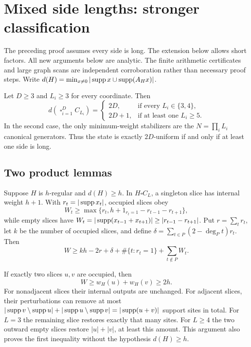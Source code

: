 \clearpage
\section*{Mixed side lengths: stronger classification}

The preceding proof assumes every side is long. The extension below allows short factors. All new arguments below are analytic. The finite arithmetic certificates and large graph scans are independent corroboration rather than necessary proof steps. Write $d(H)=\min_{x\ne0}|\operatorname{supp} x\cup\operatorname{supp}(A_Hx)|$.

\begin{theorem}\label{thm:mixed}
Let $D\ge3$ and $L_i\ge3$ for every coordinate. Then
\[
d\!\left(\mathop{\square}_{i=1}^{D}C_{L_i}\right)=
\begin{cases}
2D,&\text{if every }L_i\in\{3,4\},\\
2D+1,&\text{if at least one }L_i\ge5.
\end{cases}
\]
In the second case, the only minimum-weight stabilizers are the $N=\prod_iL_i$ canonical generators. Thus the state is exactly $2D$-uniform if and only if at least one side is long.
\end{theorem}

\subsection*{Two product lemmas}
Suppose $H$ is $h$-regular and $d(H)\ge h$. In $H\square C_L$, a singleton slice has internal weight $h+1$. With $r_t=|\operatorname{supp} x_t|$, occupied slices obey
\begin{equation}\label{eq:bonus}
 W_t\ge\max\{r_t,h+1_{r_t=1}-r_{t-1}-r_{t+1}\},
\end{equation}
while empty slices have $W_t=|\operatorname{supp}(x_{t-1}+x_{t+1})|\ge|r_{t-1}-r_{t+1}|$. Put $r=\sum_t r_t$, let $k$ be the number of occupied slices, and define $\delta=\sum_{t\in P}(2-\deg_Pt)r_t$. Then
\begin{equation}\label{eq:bonus-sum}
 W\ge kh-2r+\delta+\#\{t:r_t=1\}+\sum_{t\notin P}W_t.
\end{equation}

If exactly two slices $u,v$ are occupied, then
\begin{equation}\label{eq:two-slices}
 W\ge w_H(u)+w_H(v)\ge2h.
\end{equation}
For nonadjacent slices their internal outputs are unchanged. For adjacent slices, their perturbations can remove at most $|\operatorname{supp} v\setminus\operatorname{supp} u|+|\operatorname{supp} u\setminus\operatorname{supp} v|=|\operatorname{supp}(u+v)|$ support sites in total. For $L=3$ the remaining slice restores exactly that many sites. For $L\ge4$ the two outward empty slices restore $|u|+|v|$, at least this amount. This argument also proves the first inequality without the hypothesis $d(H)\ge h$.

